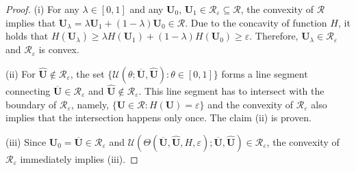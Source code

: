 \documentclass[times,final]{elsarticle}
\numberwithin{equation}{section}
\theoremstyle{definition}
\theoremstyle{remark}
\newcommand{\BU}{\mathbf{U}}
\newcommand{\hBU}{\widehat{\BU}}
\newcommand{\oBU}{\overline{\BU}}
\begin{document}
\begin{proof}
	(i) For any $\lambda \in [0,1]$ and any $\BU_0$, $\BU_1 \in \mathcal{R}_\varepsilon \subseteq \mathcal{R}$, the convexity of $\mathcal{R}$ implies that $\BU_\lambda = \lambda \BU_1 + (1-\lambda) \BU_0 \in \mathcal{R}$. Due to the concavity of function $H$, it holds that $H(\BU_\lambda) \ge \lambda H(\BU_1) + (1-\lambda) H(\BU_0) \ge \varepsilon$. Therefore, $\BU_\lambda \in \mathcal{R}_\varepsilon$ and $\mathcal{R}_\varepsilon$ is convex.
	
	(ii)
	For $\hBU \not \in \mathcal{R}_\varepsilon$, the set $\{\mathcal{U}(\theta;\oBU,\hBU) : \theta \in [0,1]\}$ forms a line segment connecting $\oBU \in \mathcal{R}_\varepsilon$ and $\hBU \not \in \mathcal{R}_\varepsilon$.
	This line segment has to intersect with the boundary of $\mathcal{R}_\varepsilon$, namely, $\{\BU\in\mathcal{R}:H(\BU) = \varepsilon\}$ and the convexity of $\mathcal{R}_\varepsilon$ also implies that the intersection happens only once. The claim (ii) is proven.
	
	(iii)
	Since $\BU_0 = \oBU \in \mathcal{R}_\varepsilon$ and $\mathcal{U}(\Theta(\oBU,\hBU,H,\varepsilon);\oBU,\hBU) \in \mathcal{R}_\varepsilon$, the convexity of $\mathcal{R}_\varepsilon$ immediately implies (iii).
\end{proof}
\end{document}
